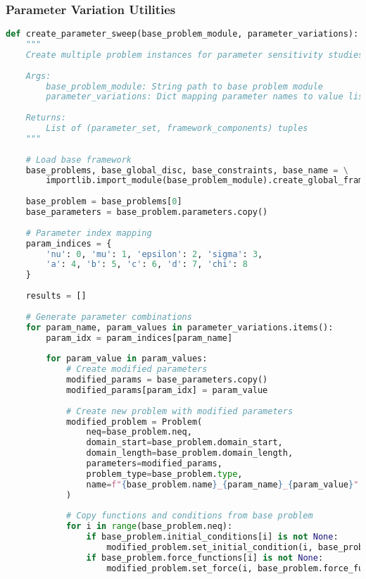 \subsubsection{Parameter Variation Utilities}

\begin{lstlisting}[language=Python, caption=Parameter Sensitivity Analysis Pattern]
def create_parameter_sweep(base_problem_module, parameter_variations):
    """
    Create multiple problem instances for parameter sensitivity studies
    
    Args:
        base_problem_module: String path to base problem module
        parameter_variations: Dict mapping parameter names to value lists
        
    Returns:
        List of (parameter_set, framework_components) tuples
    """
    
    # Load base framework
    base_problems, base_global_disc, base_constraints, base_name = \
        importlib.import_module(base_problem_module).create_global_framework()
    
    base_problem = base_problems[0]
    base_parameters = base_problem.parameters.copy()
    
    # Parameter index mapping
    param_indices = {
        'nu': 0, 'mu': 1, 'epsilon': 2, 'sigma': 3,
        'a': 4, 'b': 5, 'c': 6, 'd': 7, 'chi': 8
    }
    
    results = []
    
    # Generate parameter combinations
    for param_name, param_values in parameter_variations.items():
        param_idx = param_indices[param_name]
        
        for param_value in param_values:
            # Create modified parameters
            modified_params = base_parameters.copy()
            modified_params[param_idx] = param_value
            
            # Create new problem with modified parameters
            modified_problem = Problem(
                neq=base_problem.neq,
                domain_start=base_problem.domain_start,
                domain_length=base_problem.domain_length,
                parameters=modified_params,
                problem_type=base_problem.type,
                name=f"{base_problem.name}_{param_name}_{param_value}"
            )
            
            # Copy functions and conditions from base problem
            for i in range(base_problem.neq):
                if base_problem.initial_conditions[i] is not None:
                    modified_problem.set_initial_condition(i, base_problem.initial_conditions[i])
                if base_problem.force_functions[i] is not None:
                    modified_problem.set_force(i, base_problem.force_functions[i])
            

\end{lstlisting}
